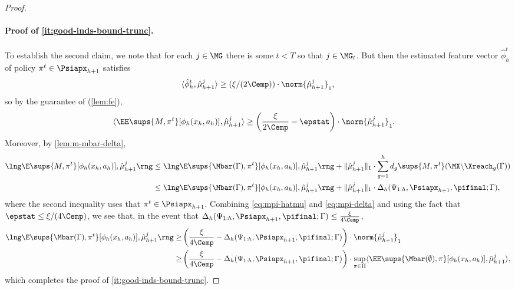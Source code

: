 \documentclass[11pt, oneside]{article}
\theoremstyle{plain}
\theoremstyle{definition}
\numberwithin{theorem}{section}
\renewcommand{\^}[1]{^{(#1)}}
\begin{document}
\begin{proof}
\paragraph{Proof of \cref{it:good-inds-bound-trunc}.} To establish the second claim, we note that for each $j \in \MG$ there is some $t < T$ so that $j \in \MG_t$. But then the estimated feature vector $\hat\phi_h^t$ of policy $\pi^t \in \Psiapx_{h+1}$ satisfies
\[\langle \hat \phi_h^t, \hat \mu_{h+1}^j\rangle \geq (\xi/(2\Cemp)) \cdot \norm{\hat \mu_{h+1}^j}_1,\]
so by the guarantee of \FE (\cref{lem:fe}),
\begin{align}
\langle \EE\sups{M, \pi^t}[\phi_h(x_h,a_h)], \hat\mu_{h+1}^j \rangle
  &\geq \left(\frac{\xi}{2\Cemp} - \epstat\right)\cdot\norm{\hat\mu_{h+1}^j}_1 .\label{eq:mpi-hatmu}
\end{align}
Moreover, by \cref{lem:m-mbar-delta},
\begin{align}
  \lng \E\sups{M, \pi^t}[\phi_h(x_h, a_h)], \hat \mu_{h+1}^j \rng &\leq  \lng \E\sups{\Mbar(\Gamma), \pi^t}[\phi_h(x_h, a_h)], \hat \mu_{h+1}^j \rng +  \| \hat \mu_{h+1}^j \|_1 \cdot \sum_{g=1}^h d_g\sups{M, \pi^t}(\MX \backslash \Xreach_g(\Gamma))\nonumber\\
  &\leq  \lng \E\sups{\Mbar(\Gamma), \pi^t}[\phi_h(x_h, a_h)], \hat \mu_{h+1}^j \rng + \| \hat \mu_{h+1}^j \|_1 \cdot \Delta_h(\Psi_{1:h},\Psiapx_{h+1},\pifinal;\Gamma)\label{eq:mpi-delta},
\end{align}
where the second inequality uses that $\pi^t \in \Psiapx_{h+1}$. Combining \cref{eq:mpi-hatmu} and \cref{eq:mpi-delta} and using the fact that $\epstat \leq \xi / (4\Cemp)$, we see that, in the event that $\Delta_h(\Psi_{1:h}, \Psiapx_{h+1}, \pifinal; \Gamma) \leq \frac{\xi}{4\Cemp}$, 
\begin{align}
  \lng \E\sups{\Mbar(\Gamma), \pi^t}[\phi_h(x_h, a_h)], \hat \mu_{h+1}^j \rng \geq &\left( \frac{\xi}{4\Cemp} - \Delta_h(\Psi_{1:h},\Psiapx_{h+1},\pifinal;\Gamma) \right) \cdot \norm{ \hat \mu_{h+1}^j}_1 \nonumber\\
  \geq & \left( \frac{\xi}{4\Cemp} - \Delta_h(\Psi_{1:h},\Psiapx_{h+1},\pifinal;\Gamma) \right) \cdot \sup_{\pi \in \Pi} \langle \EE\sups{\Mbar(\emptyset), \pi}[\phi_h(x_h,a_h)], \hat\mu_{h+1}^j\rangle\nonumber,
\end{align}
which completes the proof of \cref{it:good-inds-bound-trunc}. 
\end{proof}
\end{document}
